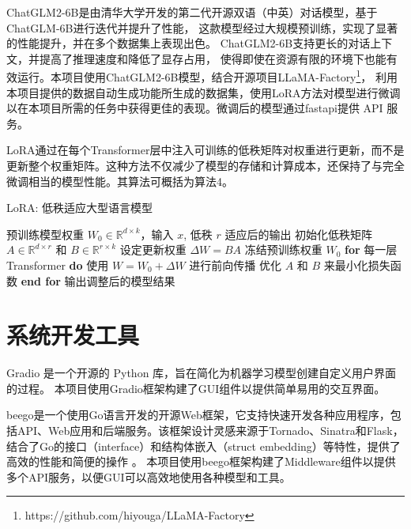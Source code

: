 \documentclass[a4paper,AutoFakeBold,oneside,12pt]{book}
\begin{document}
ChatGLM2-6B是由清华大学开发的第二代开源双语（中英）对话模型，基于ChatGLM-6B进行迭代并提升了性能，
这款模型经过大规模预训练，实现了显著的性能提升，并在多个数据集上表现出色。
ChatGLM2-6B支持更长的对话上下文，并提高了推理速度和降低了显存占用，
使得即使在资源有限的环境下也能有效运行。本项目使用ChatGLM2-6B模型，结合开源项目LLaMA-Factory\footnote{https://github.com/hiyouga/LLaMA-Factory}，
利用本项目提供的数据自动生成功能所生成的数据集，使用LoRA\cite{hu2021lora}方法对模型进行微调以在本项目所需的任务中获得更佳的表现。微调后的模型通过fastapi提供 API 服务。

LoRA通过在每个Transformer层中注入可训练的低秩矩阵对权重进行更新，而不是更新整个权重矩阵。这种方法不仅减少了模型的存储和计算成本，还保持了与完全微调相当的模型性能。其算法可概括为算法4。
\begin{algorithm}
    \begin{spacing}{1.3}
        \caption{LoRA: 低秩适应大型语言模型} 
        \label{alg:LoRA}
        \renewcommand{\algorithmicrequire}{\textbf{输入：}}
        \renewcommand{\algorithmicensure}{\textbf{输出：}} 
        \begin{algorithmic}[1] 
            \Require 预训练模型权重 $W_0 \in \mathbb{R}^{d \times k}$，输入 $x$, 低秩 $r$
            \Ensure 适应后的输出
            \State 初始化低秩矩阵 $A \in \mathbb{R}^{d \times r}$ 和 $B \in \mathbb{R}^{r \times k}$
            \State 设定更新权重 $\Delta W = BA$
            \State 冻结预训练权重 $W_0$
            \State \textbf{for} 每一层Transformer \textbf{do}
            \State \hspace{\algorithmicindent} 使用 $W = W_0 + \Delta W$ 进行前向传播
            \State \hspace{\algorithmicindent} 优化 $A$ 和 $B$ 来最小化损失函数
            \State \textbf{end for}
            \State 输出调整后的模型结果
        \end{algorithmic}
    \end{spacing}
\end{algorithm}

\section{系统开发工具}
Gradio 是一个开源的 Python 库，旨在简化为机器学习模型创建自定义用户界面的过程。
本项目使用Gradio框架构建了GUI组件以提供简单易用的交互界面。

beego是一个使用Go语言开发的开源Web框架，它支持快速开发各种应用程序，包括API、Web应用和后端服务。该框架设计灵感来源于Tornado、Sinatra和Flask，结合了Go的接口（interface）和结构体嵌入（struct embedding）等特性，提供了高效的性能和简便的操作​ 。
本项目使用beego框架构建了Middleware组件以提供多个API服务，以便GUI可以高效地使用各种模型和工具。
\end{document}
